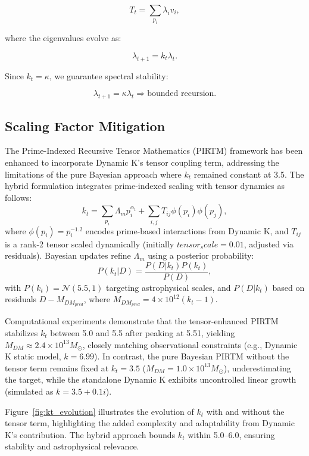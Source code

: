 \documentclass{article}
\theoremstyle{plain}
\begin{document}
\begin{equation}
    T_t = \sum_{p_i} \lambda_i v_i,
\end{equation}

where the eigenvalues evolve as:

\begin{equation}
    \lambda_{t+1} = k_t \lambda_t.
\end{equation}

Since $k_t = \kappa$, we guarantee spectral stability:

\begin{equation}
    \lambda_{t+1} = \kappa \lambda_t \Rightarrow \text{bounded recursion}.
\end{equation}

\subsection{Scaling Factor Mitigation}
The Prime-Indexed Recursive Tensor Mathematics (PIRTM) framework has been enhanced to incorporate Dynamic K’s tensor coupling term, addressing the limitations of the pure Bayesian approach where \( k_t \) remained constant at 3.5. The hybrid formulation integrates prime-indexed scaling with tensor dynamics as follows:
\[
k_t = \sum_{p_i} \Lambda_m p_i^{\alpha_t} + \sum_{i,j} T_{ij} \phi(p_i) \phi(p_j),
\]
where \( \phi(p_i) = p_i^{-1.2} \) encodes prime-based interactions from Dynamic K, and \( T_{ij} \) is a rank-2 tensor scaled dynamically (initially \( tensor_scale = 0.01 \), adjusted via residuals). Bayesian updates refine \( \Lambda_m \) using a posterior probability:
\[
P(k_t | D) = \frac{P(D | k_t) P(k_t)}{P(D)},
\]
with \( P(k_t) = \mathcal{N}(5.5, 1) \) targeting astrophysical scales, and \( P(D | k_t) \) based on residuals \( D - M_{DM_{pred}} \), where \( M_{DM_{pred}} = 4 \times 10^{12} (k_t - 1) \).

Computational experiments demonstrate that the tensor-enhanced PIRTM stabilizes \( k_t \) between 5.0 and 5.5 after peaking at 5.51, yielding \( M_{DM} \approx 2.4 \times 10^{13} M_\odot \), closely matching observational constraints (e.g., Dynamic K static model, \( k = 6.99 \)). In contrast, the pure Bayesian PIRTM without the tensor term remains fixed at \( k_t = 3.5 \) (\( M_{DM} = 1.0 \times 10^{13} M_\odot \)), underestimating the target, while the standalone Dynamic K exhibits uncontrolled linear growth (simulated as \( k = 3.5 + 0.1i \)).

Figure~\ref{fig:kt_evolution} illustrates the evolution of \( k_t \) with and without the tensor term, highlighting the added complexity and adaptability from Dynamic K’s contribution. The hybrid approach bounds \( k_t \) within 5.0–6.0, ensuring stability and astrophysical relevance.
\end{document}

